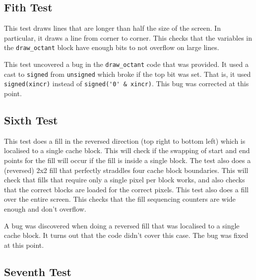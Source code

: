 \documentclass[]{article}
\begin{document}

\subsection{Fith Test} %
\label{sub:fith_test}

This test draws lines that are longer than half the size of the screen. In particular, it draws a line from corner to corner. This checks that the variables in the \verb"draw_octant" block have enough bits to not overflow on large lines.

This test uncovered a bug in the \verb"draw_octant" code that was provided. It used a cast to \verb"signed" from \verb"unsigned" which broke if the top bit was set. That is, it used \verb"signed(xincr)" instead of \verb"signed('0' & xincr)". This bug was corrected at this point.


\subsection{Sixth Test} %
\label{sub:sixth_test}

This test does a fill in the reversed direction (top right to bottom left) which is localised to a single cache block. This will check if the swapping of start and end points for the fill will occur if the fill is inside a single block. The test also does a (reversed) 2x2 fill that perfectly straddles four cache block boundaries. This will check that fills that require only a single pixel per block works, and also checks that the correct blocks are loaded for the correct pixels. This test also does a fill over the entire screen. This checks that the fill sequencing counters are wide enough and don't overflow.

A bug was discovered when doing a reversed fill that was localised to a single cache block. It turns out that the code didn't cover this case. The bug was fixed at this point.


\subsection{Seventh Test} %
\label{sub:seventh_test}
\end{document}
